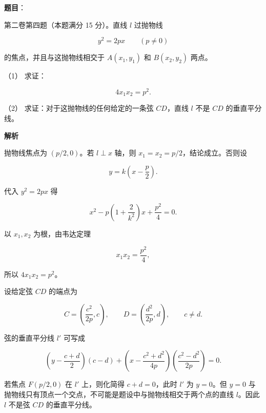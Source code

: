 \begin{answer}

\textbf{题目}：

第二卷第四题（本题满分 15 分）。直线 $l$ 过抛物线

\nopagebreak[4]
\[
y^2=2px\qquad(p\ne0)
\]

的焦点，并且与这抛物线相交于 $A(x_1,y_1)$ 和 $B(x_2,y_2)$ 两点。

（1） 求证：

\nopagebreak[4]
\[
4x_1x_2=p^2.
\]

（2） 求证：对于这抛物线的任何给定的一条弦 $CD$，直线 $l$ 不是 $CD$ 的垂直平分线。

\textbf{解析}


抛物线焦点为 $(p/2,0)$。若 $l\perp x$ 轴，则 $x_1=x_2=p/2$，结论成立。否则设

\nopagebreak[4]
\[
y=k\left(x-\frac p2\right).
\]

代入 $y^2=2px$ 得

\nopagebreak[4]
\[
x^2-p\left(1+\frac2{k^2}\right)x+\frac{p^2}{4}=0.
\]

以 $x_1,x_2$ 为根，由韦达定理

\nopagebreak[4]
\[
x_1x_2=\frac{p^2}{4},
\]

所以 $4x_1x_2=p^2$。


设给定弦 $CD$ 的端点为

\nopagebreak[4]
\[
C=\left(\frac{c^2}{2p},c\right),\qquad
D=\left(\frac{d^2}{2p},d\right),
\qquad c\ne d.
\]

弦的垂直平分线 $l'$ 可写成

\nopagebreak[4]
\[
\left(y-\frac{c+d}{2}\right)(c-d)
+\left(x-\frac{c^2+d^2}{4p}\right)
\left(\frac{c^2-d^2}{2p}\right)=0.
\]

若焦点 $F(p/2,0)$ 在 $l'$ 上，则化简得 $c+d=0$，此时 $l'$ 为 $y=0$。但 $y=0$ 与抛物线只有顶点一个交点，不可能是题设中与抛物线相交于两个点的直线 $l$。因此 $l$ 不是弦 $CD$ 的垂直平分线。



\end{answer}
